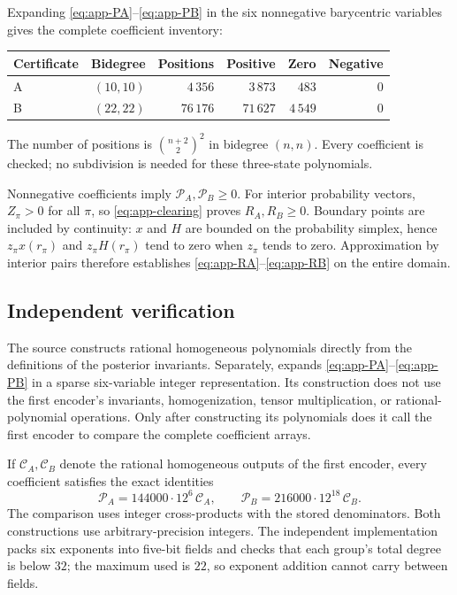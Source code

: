 Expanding \eqref{eq:app-PA}--\eqref{eq:app-PB} in the six nonnegative
barycentric variables gives the complete coefficient inventory:
\begin{center}
\begin{tabular}{lrrrrr}
\hline
Certificate & Bidegree & Positions & Positive & Zero & Negative\\
\hline
A & \((10,10)\) & \(4\,356\) & \(3\,873\) & \(483\) & \(0\)\\
B & \((22,22)\) & \(76\,176\) & \(71\,627\) & \(4\,549\) & \(0\)\\
\hline
\end{tabular}
\end{center}
The number of positions is \(\binom{n+2}{2}^2\) in bidegree \((n,n)\).
Every coefficient is checked; no subdivision is needed for these
three-state polynomials.

Nonnegative coefficients imply \(\mathcal P_A,\mathcal P_B\ge0\).
For interior probability vectors, \(Z_\pi>0\) for all \(\pi\), so
\eqref{eq:app-clearing} proves \(R_A,R_B\ge0\).
Boundary points are included by continuity: \(x\) and \(H\) are bounded on
the probability simplex, hence \(z_\pi x(r_\pi)\) and
\(z_\pi H(r_\pi)\) tend to zero when \(z_\pi\) tends to zero.
Approximation by interior pairs therefore establishes
\eqref{eq:app-RA}--\eqref{eq:app-RB} on the entire domain.

\subsection{Independent verification}

The source  constructs rational
homogeneous polynomials directly from the definitions of the posterior
invariants.  Separately,
 expands
\eqref{eq:app-PA}--\eqref{eq:app-PB} in a sparse six-variable integer
representation.  Its construction does not use the first encoder's
invariants, homogenization, tensor multiplication, or rational-polynomial
operations.  Only after constructing its polynomials does it call the
first encoder to compare the complete coefficient arrays.

If \(\mathcal C_A,\mathcal C_B\) denote the rational homogeneous outputs of
the first encoder, every coefficient satisfies the exact identities
\[
 \mathcal P_A=144000\cdot12^6\,\mathcal C_A,\qquad
 \mathcal P_B=216000\cdot12^{18}\,\mathcal C_B.
\]
The comparison uses integer cross-products with the stored denominators.
Both constructions use arbitrary-precision integers.  The independent
implementation packs six exponents into five-bit fields and checks that
each group's total degree is below \(32\); the maximum used is \(22\),
so exponent addition cannot carry between fields.

